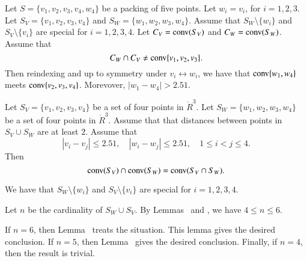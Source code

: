 \begin{tarskidata}
\begin{tarski}
\begin{lemma}
Let $S=\{v_1,v_2,v_3,v_4,w_4\}$ be a packing of five points.
Let $w_i=v_i$, for $i=1,2,3$.  Let $S_V=\{v_1,v_2,v_3,v_4\}$
and $S_W=\{w_1,w_2,w_3,w_4\}$. 
Assume that $S_W\setminus \{w_i\}$ and $S_V\setminus\{v_i\}$
are special for $i=1,2,3,4$.
 Let $C_V = {\operatorname{conv}}(S_V)$ and
$C_W={\operatorname{conv}}(S_W)$.  Assume that 
   $$
   C_W \cap C_V \ne {\operatorname{conv}}\{v_1,v_2,v_3\}.
   $$
Then reindexing and up to symmetry under $v_i\leftrightarrow w_i$,
we have that ${\operatorname{conv}}\{w_1,w_4\}$ meets ${\operatorname{conv}}\{v_2,v_3,v_4\}$.
Morevover, $|w_1-w_4|>2.51$.
\end{lemma}

\begin{proved}
\swallowed\end{proved}
\end{tarski}






\begin{tarski}

\begin{lemma}
Let $S_V=\{v_1,v_2,v_3,v_4\}$ be a set of four
points in $\ring{R}^3$.  Let $S_W=\{w_1,w_2,w_3,w_4\}$ be a set
of four points in $\ring{R}^3$.  Assume that that distances
between points in $S_V\cup S_W$ are at least $2$.  Assume that
  $$
  |v_i-v_j|\le 2.51,\quad |w_i -w_j|\le 2.51,\quad 1\le i<j\le 4.
  $$
Then $${\operatorname{conv}}(S_V)\cap {\operatorname{conv}}(S_W) = {\operatorname{conv}}(S_V\cap S_W).$$
\end{lemma}

\begin{proved}
We have that $S_W\setminus\{w_i\}$ and $S_V\setminus\{v_i\}$ are
special for $i=1,2,3,4$.

Let $n$ be the cardinality of $S_W\cup S_V$.  By Lemmas~
and , we have $4\le n\le 6$.  

If $n=6$,
then Lemma~ treats the situation.  
This
lemma gives the desired conclusion.
If $n=5$, then Lemma~ gives the desired conclusion.
Finally, if $n=4$, then the result is trivial.
\swallowed\end{proved}
\end{tarski}






\end{tarskidata}
